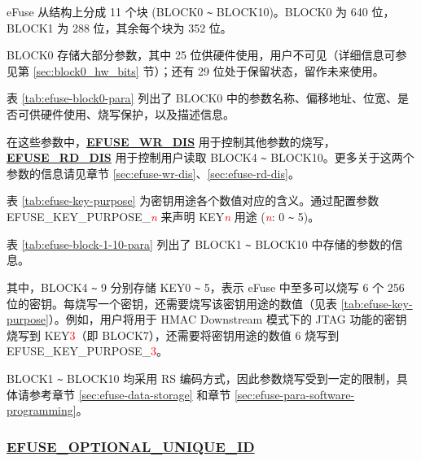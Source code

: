 \documentclass[main\_\_CN.tex]{subfiles}
\begin{document}
eFuse 从结构上分成 11 个块 (BLOCK0 \verb+~+ BLOCK10)。BLOCK0 为 640 位，BLOCK1 为 288 位，其余每个块为 352 位。

BLOCK0 存储大部分参数，其中 25 位供硬件使用，用户不可见（详细信息可参见第 \ref{sec:block0_hw_bits} 节）；还有 29 位处于保留状态，留作未来使用。


表 \ref{tab:efuse-block0-para} 列出了 BLOCK0 中的参数名称、偏移地址、位宽、是否可供硬件使用、烧写保护，以及描述信息。

在这些参数中，{\bfseries \hyperref[fielddesc:EFUSEWRDIS]{EFUSE\_WR\_DIS}} 用于控制其他参数的烧写，{\bfseries \hyperref[fielddesc:EFUSERDDIS]{EFUSE\_RD\_DIS}} 用于控制用户读取 BLOCK4 \verb+~+ BLOCK10。更多关于这两个参数的信息请见章节 \ref{sec:efuse-wr-dis}、\ref{sec:efuse-rd-dis}。

\clearpage
\begin{landscape}



\end{landscape}
\restoregeometry
\clearpage


表 \ref{tab:efuse-key-purpose} 为密钥用途各个数值对应的含义。通过配置参数 EFUSE\_KEY\_PURPOSE\_\textcolor{red}{\it{n}} 来声明 KEY\textcolor{red}{\it{n}} 用途 (\textcolor{red}{\it{n}}: 0 \verb+~+ 5)。



表 \ref{tab:efuse-block-1-10-para} 列出了 BLOCK1 \verb+~+ BLOCK10 中存储的参数的信息。



其中，BLOCK4 \verb+~+ 9 分别存储 KEY0 \verb+~+ 5，表示 eFuse 中至多可以烧写 6 个 256 位的密钥。每烧写一个密钥，还需要烧写该密钥用途的数值（见表 \ref{tab:efuse-key-purpose}）。例如，用户将用于 HMAC Downstream 模式下的 JTAG 功能的密钥烧写到 KEY\textcolor{red}{3}（即 BLOCK7），还需要将密钥用途的数值 6 烧写到 EFUSE\_KEY\_PURPOSE\_\textcolor{red}{3}。

BLOCK1 \verb+~+ BLOCK10 均采用 RS 编码方式，因此参数烧写受到一定的限制，具体请参考章节 \ref{sec:efuse-data-storage} 和章节 \ref{sec:efuse-para-software-programming}。

\subsubsection{\texorpdfstring{\hyperref[fielddesc:EFUSEOPTIONALUNIQUEID]{EFUSE\_OPTIONAL\_UNIQUE\_ID}}{EFUSE\_OPTIONAL\_UNIQUE\_ID}}
\label{sec:efuse-optional-unique-id}
\end{document}
